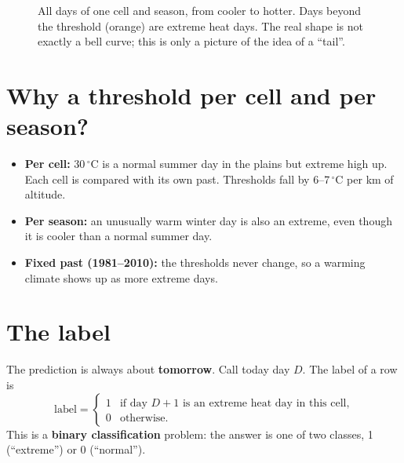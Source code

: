 \begin{figure}[H]
\centering
{}
\caption{All days of one cell and season, from cooler to hotter. Days beyond the threshold (orange) are extreme heat
days. The real shape is not exactly a bell curve; this is only a picture of the idea of a ``tail''.}
\end{figure}

\section{Why a threshold per cell and per season?}
\begin{itemize}
  \item \textbf{Per cell:} 30\,$^\circ$C is a normal summer day in the plains but extreme high up. Each cell is compared
        with its own past. Thresholds fall by 6--7\,$^\circ$C per km of altitude.
  \item \textbf{Per season:} an unusually warm winter day is also an extreme, even though it is cooler than a normal
        summer day.
  \item \textbf{Fixed past (1981--2010):} the thresholds never change, so a warming climate shows up as more extreme days.
\end{itemize}

\section{The label}
The prediction is always about \textbf{tomorrow}. Call today day $D$. The label of a row is
\[
  \text{label}=\begin{cases}1 & \text{if day }D+1\text{ is an extreme heat day in this cell,}\\ 0 & \text{otherwise.}\end{cases}
\]
This is a \textbf{binary classification} problem: the answer is one of two classes, 1 (``extreme'') or 0 (``normal'').

